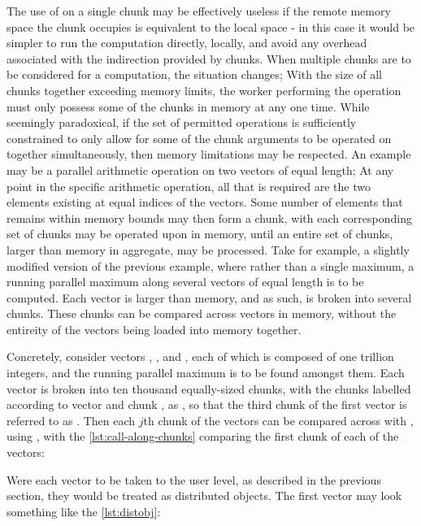 The use of  on a single chunk may be effectively
useless if the remote memory space the chunk occupies is equivalent to
the local space - in this case it would be simpler to run the
computation directly, locally, and avoid any overhead associated with
the indirection provided by chunks. When multiple chunks are to be
considered for a computation, the situation changes; With the size of
all chunks together exceeding memory limits, the worker performing the
operation must only possess some of the chunks in memory at any one
time. While seemingly paradoxical, if the set of permitted operations is
sufficiently constrained to only allow for some of the chunk arguments
to be operated on together simultaneously, then memory limitations may
be respected. An example may be a parallel arithmetic operation on two
vectors of equal length; At any point in the specific arithmetic
operation, all that is required are the two elements existing at equal
indices of the vectors. Some number of elements that remains within
memory bounds may then form a chunk, with each corresponding set of
chunks may be operated upon in memory, until an entire set of chunks,
larger than memory in aggregate, may be processed. Take for example, a
slightly modified version of the previous example, where rather than a
single maximum, a running parallel maximum along several vectors of
equal length is to be computed. Each vector is larger than memory, and
as such, is broken into several chunks. These chunks can be compared
across vectors in memory, without the entireity of the vectors being
loaded into memory together.

Concretely, consider vectors , , and ,
each of which is composed of one trillion integers, and the running
parallel maximum is to be found amongst them. Each vector is broken into
ten thousand equally-sized chunks, with the chunks labelled according to
vector  and chunk , as , so that the
third chunk of the first vector is referred to as . Then
each \(j\)th chunk of the vectors can be compared across with
, using , with the \cref{lst:call-along-chunks}
comparing the first chunk of each of the vectors:


Were each vector to be taken to the user level, as described in the
previous section, they would be treated as distributed objects. The
first vector  may look something like the \cref{lst:distobj}:

